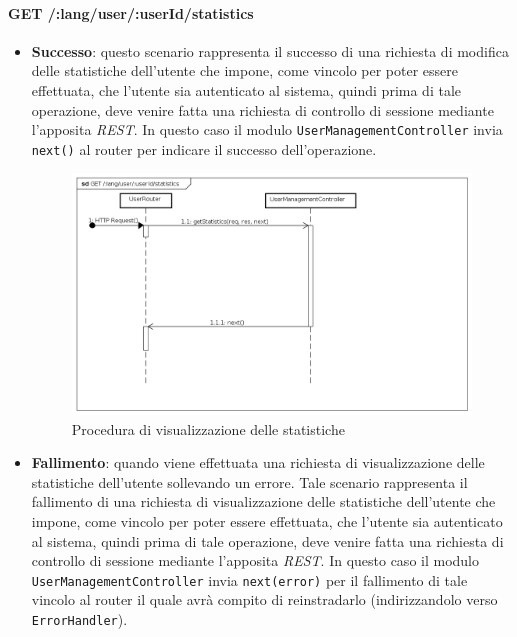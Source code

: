 \paragraph{GET /:lang/user/:userId/statistics}
\begin{itemize}
\item \textbf{Successo}: questo scenario rappresenta il successo di una richiesta di modifica delle statistiche  dell'utente che impone, come vincolo per poter essere effettuata, che l'utente sia autenticato al sistema, quindi prima di tale operazione, deve venire fatta una richiesta di controllo di sessione mediante l'apposita \textit{REST}.  
In questo caso il modulo \texttt{UserManagementController} invia \texttt{next()} al router per indicare il successo dell'operazione.

\label{Procedura di visualizzazione delle statistiche}
\begin{figure}[ht]
	\centering
	\includegraphics[scale=0.40]{UML/DiagrammiDiSequenza/Back-end/GET_LangUserUserIdStatisticsSuccess.png}
	\caption{Procedura di visualizzazione delle statistiche}
\end{figure}
\FloatBarrier
\item \textbf{Fallimento}: quando viene effettuata una richiesta di visualizzazione delle statistiche dell'utente sollevando un errore. Tale scenario rappresenta il fallimento di una richiesta di visualizzazione delle statistiche dell'utente che impone, come vincolo per poter essere effettuata, che l'utente sia autenticato al sistema, quindi prima di tale operazione, deve venire fatta una richiesta di controllo di sessione mediante l'apposita \textit{REST}. In questo caso il modulo \texttt{UserManagementController} invia \texttt{next(error)} per il fallimento di tale vincolo al router il quale avrà compito di reinstradarlo (indirizzandolo verso \texttt{ErrorHandler}).


\end{itemize}
